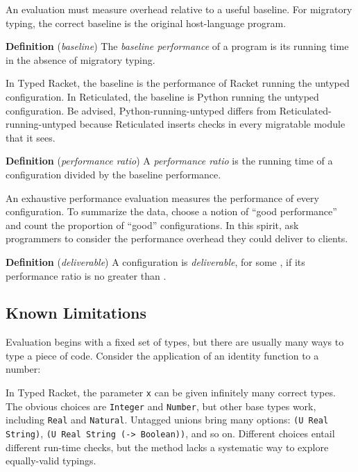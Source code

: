 \documentclass[ twoside,open=right,titlepage,numbers=noenddot,headinclude,%
                footinclude=true,cleardoublepage=empty,abstract=off,
                BCOR=5mm,paper=a4,fontsize=11pt,%
                ngerman,american,%
                parts,pdfspacing]{scrreprt}
\newcommand{\Scribtexttt}[1]{{\texttt{#1}}}
\newcommand{\Stttextmore}{{\fontencoding{T1}\selectfont>}}
\newcommand{\Ssubsubsection}[2]{\subsubsection[#1]{#2}}
\renewcommand{\Ssubsubsection}[2]{\subsection[#1]{#2}}
\begin{document}
An evaluation must measure overhead relative to a useful baseline.
For migratory typing, the correct baseline is the original host{-}language program.

\relax{\vspace{1ex}
}\textbf{Definition} (\emph{baseline}) The \emph{baseline performance} of a program is its running time in the absence
 of migratory typing.\relax{\vspace{1ex}
}

In Typed Racket, the baseline is the performance of Racket running the
 untyped configuration.
In Reticulated, the baseline is Python running the untyped configuration.
Be advised, Python{-}running{-}untyped differs from Reticulated{-}running{-}untyped
 because Reticulated inserts checks in every migratable module that
 it sees.

\relax{\vspace{1ex}
}\textbf{Definition} (\emph{performance ratio}) A \emph{performance ratio} is the running time of a configuration
 divided by the baseline performance.\relax{\vspace{1ex}
}

An exhaustive performance evaluation measures the performance of every
 configuration.
To summarize the data, choose a notion of
 {``}good performance{''} and count the proportion of {``}good{''} configurations.
In this spirit,  ask programmers to consider the
 performance overhead they could deliver to clients.

\relax{\vspace{1ex}
}\textbf{Definition} (\emph{deliverable}) A configuration is \emph{deliverable},
 for some ,
 if its performance ratio is no greater than .\relax{\vspace{1ex}
}

\Ssubsubsection{Known Limitations}{Known Limitations}\label{t:x28part_x22secx3aperfx3alimitsx22x29}

Evaluation begins with a fixed set of types, but there are usually many
 ways to type a piece of code.
Consider the application of an identity function to a number:

\relax{\medskip}

\noindent{}In Typed Racket, the parameter \Scribtexttt{x} can be given infinitely many
 correct types.
The obvious choices are \Scribtexttt{Integer} and \Scribtexttt{Number},
 but other base types work, including \Scribtexttt{Real} and \Scribtexttt{Natural}.
Untagged unions bring many options: \Scribtexttt{(U Real String)}, \Scribtexttt{(U Real String ({-}{\Stttextmore} Boolean))},
 and so on.
Different choices entail different run{-}time checks, but the method lacks
 a systematic way to explore equally{-}valid typings.
\end{document}
